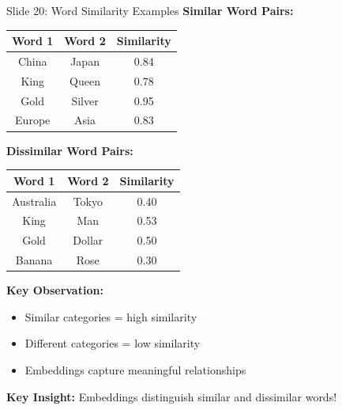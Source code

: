 \documentclass[8pt]{beamer}
\begin{document}
	\begin{frame}{Slide 20: Word Similarity Examples}
		\fontsize{6.5}{7.5}\selectfont
		\textbf{Similar Word Pairs:}
		\begin{tabular}{|c|c|c|}
			\hline
			\textbf{Word 1} & \textbf{Word 2} & \textbf{Similarity} \\
			\hline
			China & Japan & 0.84 \\
			King & Queen & 0.78 \\
			Gold & Silver & 0.95 \\
			Europe & Asia & 0.83 \\
			\hline
		\end{tabular}
		
		\vspace{0.1cm}
		\textbf{Dissimilar Word Pairs:}
		\begin{tabular}{|c|c|c|}
			\hline
			\textbf{Word 1} & \textbf{Word 2} & \textbf{Similarity} \\
			\hline
			Australia & Tokyo & 0.40 \\
			King & Man & 0.53 \\
			Gold & Dollar & 0.50 \\
			Banana & Rose & 0.30 \\
			\hline
		\end{tabular}
		
		\vspace{0.1cm}
		\textbf{Key Observation:}
		\begin{itemize}
			\item Similar categories = high similarity
			\item Different categories = low similarity
			\item Embeddings capture meaningful relationships
		\end{itemize}
		
		\textcolor{myblue}{\textbf{Key Insight:}} Embeddings distinguish similar and dissimilar words!
	\end{frame}
	
\end{document}
